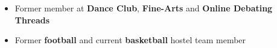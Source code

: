 

\begin{cvparagraph}

\begin{itemize}
  \item Former member at \textbf{Dance Club}, \textbf{Fine-Arts} and \textbf{Online Debating Threads}
  \item Former \textbf{football} and current \textbf{basketball} hostel team member
\end{itemize}

\end{cvparagraph}
